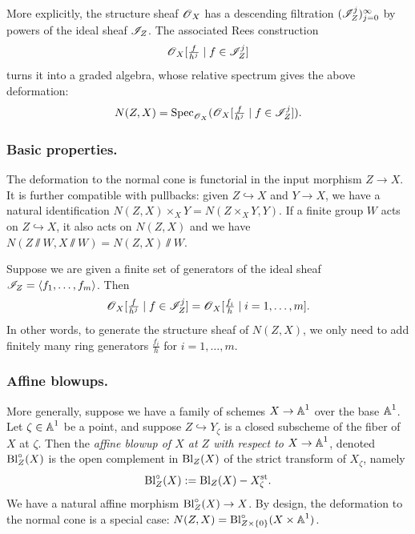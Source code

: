 More explicitly, the structure sheaf $\operatorname{\mathscr{O}}_X$ has a descending filtration $(\mathscr{I}^j_{Z})_{j = 0}^{\infty}$ by powers of the ideal sheaf $\mathscr{I}_Z$. The associated Rees construction
\begin{equation*}
 \operatorname{\mathscr{O}}_X[\tfrac{f}{h^j} \mid f \in \mathscr{I}^j_Z]    
\end{equation*}
turns it into a graded algebra, whose relative spectrum gives the above deformation:
\begin{equation*}
 N(Z, X) = \operatorname{Spec}_{\operatorname{\mathscr{O}}_X}(\operatorname{\mathscr{O}}_X[\tfrac{f}{h^j} \mid f \in \mathscr{I}^j_Z]).  
\end{equation*}






\subsubsection{Basic properties.}

The deformation to the normal cone is functorial in the input morphism $Z \to X$.
It is further compatible with pullbacks: given $Z \hookrightarrow X$ and $Y \to X$, we have a natural identification $N(Z, X) \times_X Y = N(Z\times_X Y, Y)$.
If a finite group $W$ acts on $Z \hookrightarrow X$, it also acts on $N(Z, X)$ and we have $N(Z \sslash W, X\sslash W) = N(Z, X) \sslash W$.

    
Suppose we are given a finite set of generators of the ideal sheaf $\mathscr{I}_Z = \langle f_1, \dots, f_m  \rangle$. Then 
\begin{equation*}\label{section: generators of the deformation}
    \operatorname{\mathscr{O}}_X[\tfrac{f}{h^j} \mid f \in \mathscr{I}^j_Z] = \operatorname{\mathscr{O}}_X[\tfrac{f_i}{h} \mid i = 1, \dots, m]. 
\end{equation*}
In other words, to generate the structure sheaf of $N(Z, X)$, we only need to add finitely many ring generators
$\tfrac{f_i}{h}$ for $i = 1, \dots, m$.




\subsubsection{Affine blowups.}\label{subsubsection: affine blowups.}
More generally, suppose we have a family of schemes $X \to \operatorname{\mathbb{A}}^1$ over the base $\operatorname{\mathbb{A}}^1$. Let $\zeta \in \operatorname{\mathbb{A}}^1$ be a point, and suppose $Z \hookrightarrow Y_{\zeta}$ is a closed subscheme of the fiber of $X$ at $\zeta$.
Then the \textit{affine blowup of $X$ at $Z$ with respect to $X \to \operatorname{\mathbb{A}}^1$}, denoted $\operatorname{Bl}^{\circ}_Z(X)$ is the open complement in $\operatorname{Bl}_{Z}(X)$ of the strict transform of $X_{\zeta}$, namely
\begin{equation*}
    \operatorname{Bl}^{\circ}_Z(X) := \operatorname{Bl}_Z(X) - X^{\mathrm{st}}_{\zeta}.
\end{equation*}
We have a natural affine morphism $\operatorname{Bl}^{\circ}_Z(X) \to X$.
%
By design, the deformation to the normal cone is a special case: $N(Z, X) = \operatorname{Bl}^{\circ}_{Z \times \{0\}}(X \times \operatorname{\mathbb{A}}^1)$.

